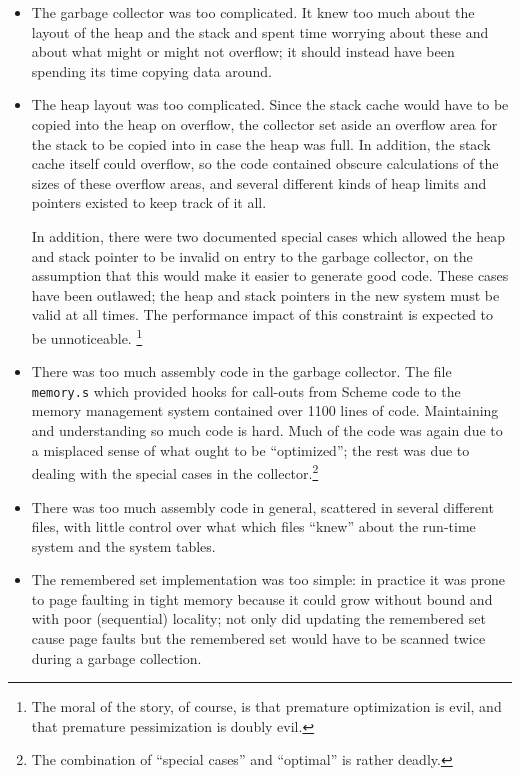 \begin{itemize}
\item
The garbage collector was too complicated. It knew too much about the layout
of the heap and the stack and spent time worrying about these and about what
might or might not overflow; it should instead have been spending its time
copying data around.

\item
The heap layout was too complicated. Since the stack cache would have to be
copied into the heap on overflow, the collector set aside an overflow area
for the stack to be copied into in case the heap was full. In addition, the
stack cache itself could overflow, so the code contained obscure
calculations of the sizes of these overflow areas, and several different
kinds of heap limits and pointers existed to keep track of it all.

In addition, there were two documented special cases which allowed the heap
and stack pointer to be invalid on entry to the garbage collector, on the
assumption that this would make it easier to generate good code. These cases
have been outlawed; the heap and stack pointers in the new system must be
valid at all times.  The performance impact of this constraint is expected
to be unnoticeable.%
\footnote{The moral of the story, of course, is that premature optimization
is evil, and that premature pessimization is doubly evil.}

\item 
There was too much assembly code in the garbage collector. The file {\tt
memory.s} which provided hooks for call-outs from Scheme code to the memory
management system contained over 1100 lines of code. Maintaining and
understanding so much code is hard. Much of the code was again due to a
misplaced sense of what ought to be ``optimized''; the rest was due to
dealing with the special cases in the collector.\footnote{The combination of
``special cases'' and ``optimal'' is rather deadly.}

\item
There was too much assembly code in general, scattered in several different
files, with little control over what which files ``knew'' about the run-time
system and the system tables.

\item
The remembered set implementation was too simple: in practice it was prone
to page faulting in tight memory because it could grow without bound and
with poor (sequential) locality; not only did updating the remembered set
cause page faults but the remembered set would have to be scanned twice 
during a garbage collection.


\end{itemize}
